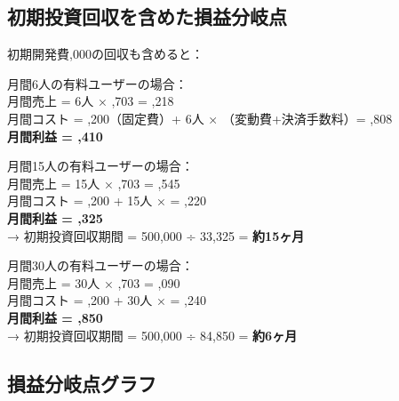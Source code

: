 \documentclass[a4paper,11pt]{ltjsarticle}
\begin{document}
\subsection{初期投資回収を含めた損益分岐点}

初期開発費,000の回収も含めると：

\begin{tcolorbox}[colback=white, colframe=lossred, boxrule=1pt, title={\textbf{初期投資回収シミュレーション}}]
月間6人の有料ユーザーの場合：\\
月間売上 = 6人 × ,703 = ,218\\
月間コスト = ,200（固定費）+ 6人 × （変動費+決済手数料）= ,808\\
\textbf{月間利益 = ,410}

\vspace{0.5em}
月間15人の有料ユーザーの場合：\\
月間売上 = 15人 × ,703 = ,545\\
月間コスト = ,200 + 15人 ×  = ,220\\
\textbf{月間利益 = ,325}\\
→ 初期投資回収期間 = 500,000 ÷ 33,325 = \textbf{約15ヶ月}

\vspace{0.5em}
月間30人の有料ユーザーの場合：\\
月間売上 = 30人 × ,703 = ,090\\
月間コスト = ,200 + 30人 ×  = ,240\\
\textbf{月間利益 = ,850}\\
→ 初期投資回収期間 = 500,000 ÷ 84,850 = \textbf{約6ヶ月}
\end{tcolorbox}


\subsection{損益分岐点グラフ}
\end{document}
